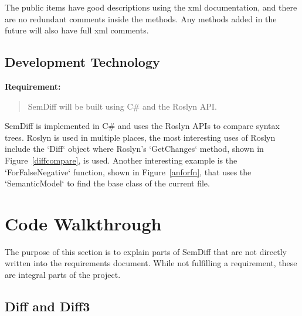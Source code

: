 \documentclass[draftclsnofoot,onecolumn]{IEEEtran}
\begin{document}
The public items have good descriptions using the xml documentation, and 
there are no redundant comments inside the methods. Any methods added in the 
future will also have full xml comments.

\subsection{Development Technology}%

\textbf{Requirement:}

\begin{quote}

SemDiff will be built using C\# and the Roslyn API.

\end{quote}

SemDiff is implemented in C\# and uses the Roslyn APIs to compare syntax 
trees. Roslyn is used in multiple places, the most interesting uses of Roslyn 
include the `Diff` object where Roslyn’s `GetChanges` method, shown in 
Figure~\ref{diffcompare}, is used. Another interesting example is the 
`ForFalseNegative` function, shown in Figure~\ref{anforfn}, that uses the 
`SemanticModel` to find the base class of the current file.
\section{Code Walkthrough}%

The purpose of this section is to explain parts of SemDiff that are not 
directly written into the requirements document. While not fulfilling a 
requirement, these are integral parts of the project.

\subsection{Diff and Diff3}%
\end{document}
